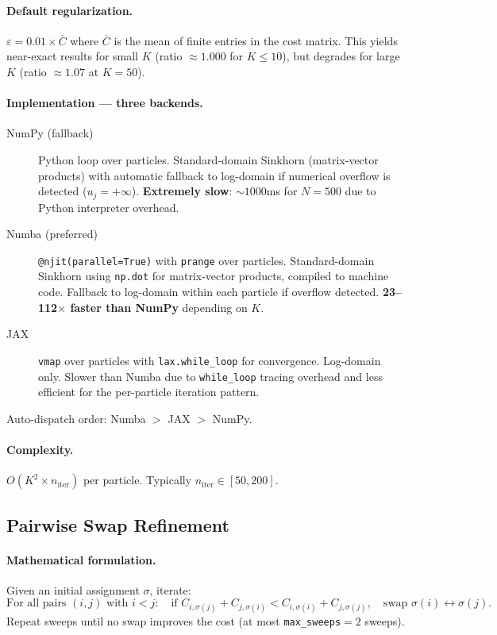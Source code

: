 \documentclass[11pt,a4paper]{article}
\begin{document}
\paragraph{Default regularization.} $\varepsilon = 0.01 \times \overline{C}$ where $\overline{C}$ is the mean of finite entries in the cost matrix. This yields near-exact results for small $K$ (ratio $\approx 1.000$ for $K \le 10$), but degrades for large $K$ (ratio $\approx 1.07$ at $K = 50$).

\paragraph{Implementation --- three backends.}
\begin{description}
  \item[NumPy (fallback)] Python loop over particles. Standard-domain Sinkhorn (matrix-vector products) with automatic fallback to log-domain if numerical overflow is detected ($u_j = +\infty$). \textbf{Extremely slow}: $\sim 1000$ms for $N=500$ due to Python interpreter overhead.

  \item[Numba (preferred)] \texttt{@njit(parallel=True)} with \texttt{prange} over particles. Standard-domain Sinkhorn using \texttt{np.dot} for matrix-vector products, compiled to machine code. Fallback to log-domain within each particle if overflow detected. \textbf{23--112$\times$ faster than NumPy} depending on $K$.

  \item[JAX] \texttt{vmap} over particles with \texttt{lax.while\_loop} for convergence. Log-domain only. Slower than Numba due to \texttt{while\_loop} tracing overhead and less efficient for the per-particle iteration pattern.
\end{description}

Auto-dispatch order: Numba $>$ JAX $>$ NumPy.

\paragraph{Complexity.} $O(K^2 \times n_{\text{iter}})$ per particle. Typically $n_{\text{iter}} \in [50, 200]$.

\subsection{Pairwise Swap Refinement}
\label{sec:swap}

\paragraph{Mathematical formulation.}
Given an initial assignment $\sigma$, iterate:
\[
  \text{For all pairs } (i,j) \text{ with } i < j: \quad
  \text{if } C_{i,\sigma(j)} + C_{j,\sigma(i)} < C_{i,\sigma(i)} + C_{j,\sigma(j)},
  \quad \text{swap } \sigma(i) \leftrightarrow \sigma(j).
\]
Repeat sweeps until no swap improves the cost (at most \texttt{max\_sweeps}$=2$ sweeps).
\end{document}
